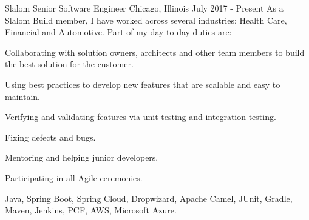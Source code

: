 
\begin{cventries}

  \experienceentry
  {Slalom} %
    {Senior Software Engineer} %
    {Chicago, Illinois} %
    {July 2017 - Present} %
    {As a Slalom Build member, I have worked across several industries: Health Care, Financial and Automotive. Part of my day to day duties are:}
    {
    		\begin{cvitems} %
			\item {Collaborating with solution owners, architects and other team members to build the best solution for the customer.}
      		\item {Using best practices to develop new features that are scalable and easy to maintain.}
      		\item {Verifying and validating features via unit testing and integration testing.}
      		\item {Fixing defects and bugs.}
      		\item {Mentoring and helping junior developers.}
        		\item {Participating in all Agile ceremonies.}
      	\end{cvitems}
    }
    {Java, Spring Boot, Spring Cloud, Dropwizard, Apache Camel, JUnit, Gradle, Maven, Jenkins, PCF, AWS, Microsoft Azure.}
  

\end{cventries}
